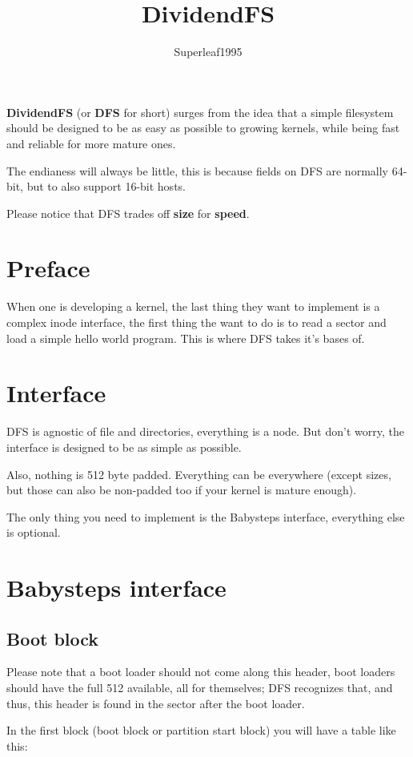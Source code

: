 \documentclass[12pt]{article}
\title{DividendFS}
\author{Superleaf1995}
\begin{document}
\maketitle

\textbf{DividendFS} (or \textbf{DFS} for short) surges from the idea that a simple filesystem should be designed to be as easy as possible to growing kernels, while being fast and reliable for more mature ones.

The endianess will always be little, this is because fields on DFS are normally 64-bit, but to also support 16-bit hosts.

Please notice that DFS trades off \textbf{size} for \textbf{speed}.

\section{Preface}
When one is developing a kernel, the last thing they want to implement is a complex inode interface, the first thing the want to do is to read a sector and load a simple hello world program.
This is where DFS takes it's bases of.

\section{Interface}
DFS is agnostic of file and directories, everything is a node. But don't worry, the interface is designed to be as simple as possible.

Also, nothing is 512 byte padded. Everything can be everywhere (except sizes, but those can also be non-padded too if your kernel is mature enough).

The only thing you need to implement is the Babysteps interface, everything else is optional.

\section{Babysteps interface}

\subsection{Boot block}

Please note that a boot loader should not come along this header, boot loaders should have the full 512 available, all for themselves; DFS recognizes that, and thus, this header is found in the sector after the boot loader.

In the first block (boot block or partition start block) you will have a table like this:
\end{document}

